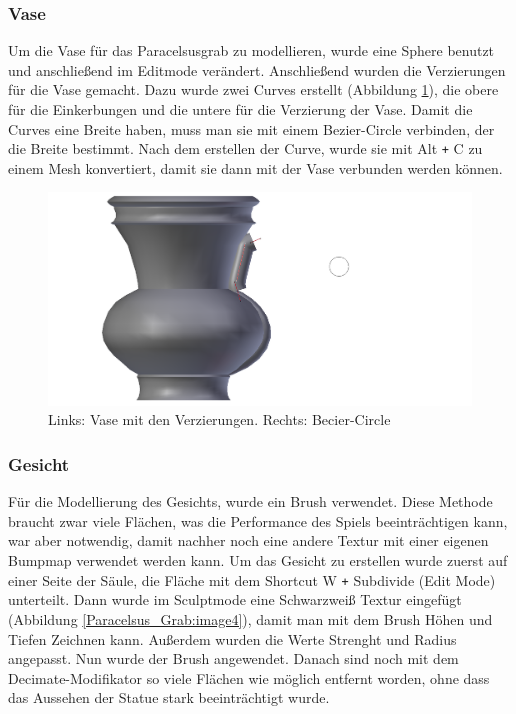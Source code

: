 \subsubsection{Vase}
Um die Vase für das Paracelsusgrab zu modellieren, wurde eine Sphere benutzt und anschließend im Editmode verändert. Anschließend wurden die Verzierungen für die Vase gemacht.
Dazu wurde zwei Curves erstellt (Abbildung \ref{Paracelsus_Grab:image5}), die obere für die Einkerbungen und die untere für die Verzierung der Vase. Damit die Curves eine
Breite haben, muss man sie mit einem Bezier-Circle verbinden, der die Breite bestimmt. Nach dem erstellen der Curve,
wurde sie mit Alt \verb-+- C zu einem Mesh konvertiert, damit sie dann mit der Vase verbunden werden können.

\begin{figure}[h]
    \centering
    \includegraphics[width=.8\textwidth]{images/Paracelsus-Grab_Vase-Curve.png}
    \caption{Links: Vase mit den Verzierungen. Rechts: Becier-Circle}
    \label{Paracelsus_Grab:image5}
\end{figure}

\subsubsection{Gesicht}
Für die Modellierung des Gesichts, wurde ein Brush verwendet. Diese Methode braucht zwar viele Flächen, was die Performance des Spiels beeinträchtigen kann, war
aber notwendig, damit nachher noch eine andere Textur mit einer eigenen Bumpmap verwendet werden kann. Um das Gesicht zu erstellen wurde zuerst auf einer Seite der Säule,
die Fläche mit dem Shortcut W \verb-+- Subdivide (Edit Mode) unterteilt. Dann wurde im Sculptmode eine Schwarzweiß Textur eingefügt (Abbildung \ref{Paracelsus_Grab:image4}),
damit man mit dem Brush Höhen und Tiefen Zeichnen kann. Außerdem wurden die Werte Strenght und Radius angepasst. Nun wurde der Brush angewendet. Danach sind noch mit dem
Decimate-Modifikator so viele Flächen wie möglich entfernt worden, ohne dass das Aussehen der Statue stark beeinträchtigt wurde.

